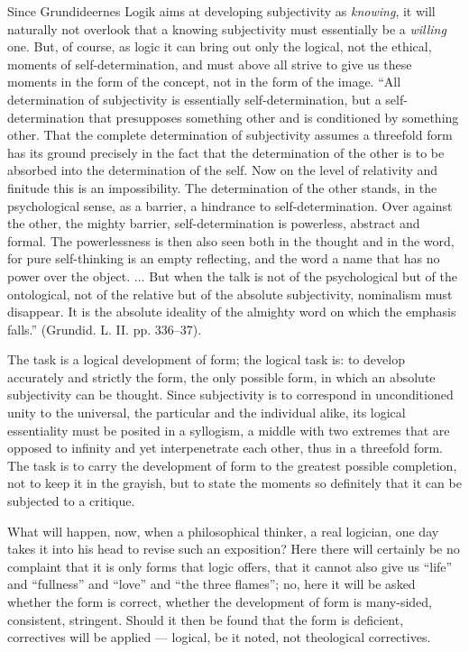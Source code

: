 \documentclass[12pt]{book}
\newcommand{\opage}[1]{\marginnote{\footnotesize\textit{[#1]}}}
\begin{document}
Since Grundideernes Logik aims at developing subjectivity as \emph{knowing}, it will naturally not
\opage{128}\setcounter{footnote}{0}%
overlook that a knowing subjectivity must essentially be a \emph{willing} one. But, of course, as logic it can bring out only the logical, not the ethical, moments of self-determination, and must above all strive to give us these moments in the form of the concept, not in the form of the image. ``All determination of subjectivity is essentially self-determination, but a self-determination that presupposes something other and is conditioned by something other. That the complete determination of subjectivity assumes a threefold form has its ground precisely in the fact that the determination of the other is to be absorbed into the determination of the self. Now on the level of relativity and finitude this is an impossibility. The determination of the other stands, in the psychological sense, as a barrier, a hindrance to self-determination. Over against the other, the mighty barrier, self-determination is powerless, abstract and formal. The powerlessness is then also seen both in the thought and in the word, for pure self-thinking is an empty reflecting, and the word a name that has no power over the object. ... But when the talk is not of the psychological but of the ontological, not of the relative but of the absolute subjectivity, nominalism must disappear. It is the absolute ideality of the almighty word on which the emphasis falls.'' (Grundid. L. II. pp. 336--37).

The task is a logical development of form; the logical task is: to develop accurately and strictly the form, the only possible form, in which an absolute subjectivity can be thought. Since subjectivity is to correspond in unconditioned unity to the universal, the particular and the individual alike, its logical essentiality must be posited in a syllogism, a middle with two extremes that are opposed to infinity and yet interpenetrate each other, thus in a threefold form. The task is to carry the development of form to the greatest possible completion, not to keep it in the grayish, but to state the moments so definitely that it can be subjected to a critique.

What will happen, now, when a philosophical thinker, a real
\opage{129}\setcounter{footnote}{0}%
logician, one day takes it into his head to revise such an exposition? Here there will certainly be no complaint that it is only forms that logic offers, that it cannot also give us ``life'' and ``fullness'' and ``love'' and ``the three flames''; no, here it will be asked whether the form is correct, whether the development of form is many-sided, consistent, stringent. Should it then be found that the form is deficient, correctives will be applied --- logical, be it noted, not theological correctives.
\end{document}
